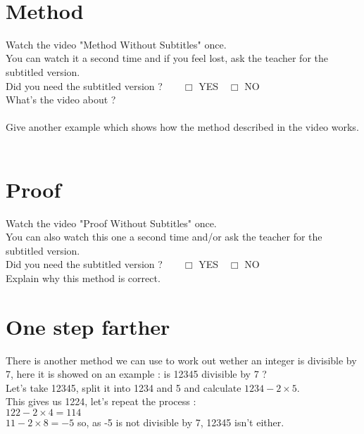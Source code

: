 \documentclass[12pt,a4paper,eval,english,firamath]{nsi}
\begin{document}
\maketitle

\ \\[-5em]
\section*{Method}
Watch the video "Method Without Subtitles" once.\\
You can watch it a second time and if you feel lost, ask the teacher for the subtitled version.\\

Did you need the subtitled version ?$\qquad\Box$ YES$\quad \Box$ NO\\

What's the video about ?\\

\\

Give another example which shows how the method described in the video works.\\

\\
\section*{Proof}
Watch the video "Proof Without Subtitles" once.\\
You can also watch this one a second time and/or ask the teacher for the subtitled version.\\

Did you need the subtitled version ?$\qquad\Box$ YES$\quad \Box$ NO\\

Explain why this method is correct.\\


\section*{One step farther}
There is another method we can use to work out wether an integer is divisible by 7, here it is showed on an example : is 12345 divisible by 7 ?\\

Let's take 12345, split it into 1234 and 5 and calculate $1234 - 2\times 5$.\\
This gives us 1224, let's repeat the process : \\
$122 - 2\times 4 = 114$\\
$11 - 2\times 8 = -5$ so, as -5 is not divisible by 7, 12345 isn't either.\\
\end{document}
